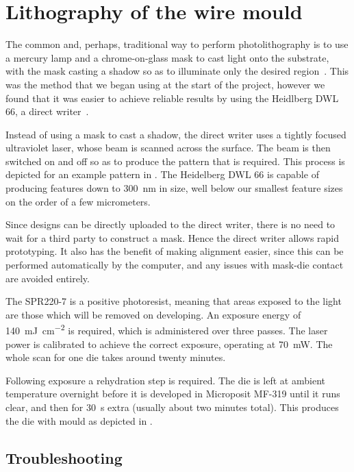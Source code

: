 \section{Lithography of the wire mould}

The common and, perhaps, traditional way to perform photolithography is to use
a mercury lamp and a chrome-on-glass mask to cast light onto the
substrate, with the mask casting a shadow so as to illuminate only the desired
region~\cite{Madou2002}. This was the method that we began using at the start of the
project, however we found that it was easier to achieve reliable results by
using the Heidlberg DWL 66, a direct writer~\cite{heidelberg}. 

Instead of using a mask to cast a shadow, the direct writer uses a tightly
focused ultraviolet laser, whose beam is scanned across the surface. The beam
is then switched on and off so as to produce the pattern that is required.
This process is depicted for an example pattern in
. The Heidelberg DWL 66 is capable of producing
features down to \SI{300}{\nano\meter} in size, well below our smallest feature
sizes on the order of a few micrometers.

Since designs can be directly uploaded to the direct writer, there is no need
to wait for a third party to construct a mask.  Hence the direct writer allows
rapid prototyping. It also has the benefit of making alignment easier, since
this can be performed automatically by the computer, and any issues with
mask-die contact are avoided entirely. 

The SPR220-7 is a positive photoresist, meaning that areas exposed to the light
are those which will be removed on developing. An exposure energy of
\SI{140}{\milli\joule\per\square\centi\meter} is required, which is
administered over three passes. The laser power is calibrated to achieve the
correct exposure, operating at \SI{70}{\milli\watt}. The
whole scan for one die takes around twenty minutes.

Following exposure a rehydration step is required. The die is left at ambient
temperature overnight before it is developed in Microposit MF-319 until it runs
clear, and then for \SI{30}{\second} extra (usually about two minutes total).
This produces the die with mould as depicted in
.

\subsection{Troubleshooting}

